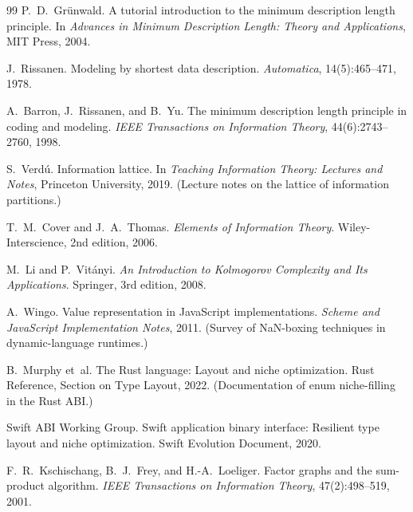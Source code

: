 \documentclass[10pt]{article}
\theoremstyle{definition}
\theoremstyle{remark}
\begin{document}
\begin{thebibliography}{99}
P.~D.~Gr{\"u}nwald.
\newblock A tutorial introduction to the minimum description length principle.
\newblock In \emph{Advances in Minimum Description Length: Theory and Applications}, MIT Press, 2004.

J.~Rissanen.
\newblock Modeling by shortest data description.
\newblock \emph{Automatica}, 14(5):465--471, 1978.

A.~Barron, J.~Rissanen, and B.~Yu.
\newblock The minimum description length principle in coding and modeling.
\newblock \emph{IEEE Transactions on Information Theory}, 44(6):2743--2760, 1998.

S.~Verd{\'u}.
\newblock Information lattice.
\newblock In \emph{Teaching Information Theory: Lectures and Notes}, Princeton University, 2019. (Lecture notes on the lattice of information partitions.)

T.~M.~Cover and J.~A.~Thomas.
\newblock \emph{Elements of Information Theory}.
\newblock Wiley-Interscience, 2nd edition, 2006.

M.~Li and P.~Vit{\'a}nyi.
\newblock \emph{An Introduction to Kolmogorov Complexity and Its Applications}.
\newblock Springer, 3rd edition, 2008.

A.~Wingo.
\newblock Value representation in JavaScript implementations.
\newblock \emph{Scheme and JavaScript Implementation Notes}, 2011. (Survey of NaN-boxing techniques in dynamic-language runtimes.)

B.~Murphy et~al.
\newblock The Rust language: Layout and niche optimization.
\newblock Rust Reference, Section on Type Layout, 2022. (Documentation of enum niche-filling in the Rust ABI.)

Swift ABI Working Group.
\newblock Swift application binary interface: Resilient type layout and niche optimization.
\newblock Swift Evolution Document, 2020.

F.~R.~Kschischang, B.~J.~Frey, and H.-A.~Loeliger.
\newblock Factor graphs and the sum-product algorithm.
\newblock \emph{IEEE Transactions on Information Theory}, 47(2):498--519, 2001.


\end{thebibliography}
\end{document}
